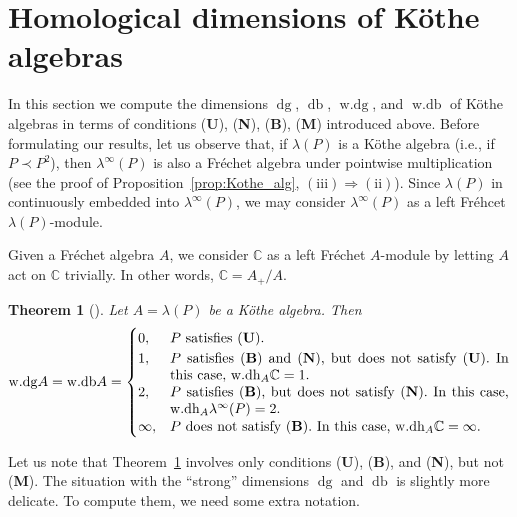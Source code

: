 \documentclass[12pt,reqno]{amsart}
\newtheorem{theorem}{Theorem}[section]
\theoremstyle{definition}
\begin{document}
\section{Homological dimensions of K\"othe algebras}
\label{sect:dims}
In this section we compute the dimensions ${\mathop{\mathrm{dg}}}$, ${\mathop{\mathrm{db}}}$, ${\mathop{\mathrm{w.dg}}}$, and ${\mathop{\mathrm{w.db}}}$ of K\"othe
algebras in terms of conditions ({\textbf{U}}), ({\textbf{N}}), ({\textbf{B}}), ({\textbf{M}}) introduced above.
Before formulating our results, let us observe that, if $\lambda(P)$ is a K\"othe algebra
(i.e., if $P\prec P^2$),
then $\lambda^\infty(P)$ is also a Fr\'echet algebra under
pointwise multiplication (see the proof of Proposition~\ref{prop:Kothe_alg},
$\mathrm{(iii)}\Longrightarrow\mathrm{(ii)}$).
Since $\lambda(P)$ in continuously embedded into $\lambda^\infty(P)$,
we may consider $\lambda^\infty(P)$ as a left Fr\'ehcet $\lambda(P)$-module.

Given a Fr\'echet algebra $A$, we consider ${\mathbb C}$ as a left Fr\'echet $A$-module by letting
$A$ act on ${\mathbb C}$ trivially. In other words, ${\mathbb C}=A_+/A$.

\begin{theorem}[{\cite[4.3]{Pir_QJM}}]
\label{thm:wdgwdb}
Let $A=\lambda(P)$ be a K\"othe algebra. Then
\begin{equation*}
{\mathop{\mathrm{w.dg}}} A={\mathop{\mathrm{w.db}}} A=
\begin{cases}
0, & \text{$P$ satisfies {\upshape ({\textbf{U}})}}.\\
1, & \parbox[t]{85mm}{$P$ satisfies {\upshape ({\textbf{B}})} and {\upshape ({\textbf{N}})},
but does not satisfy {\upshape ({\textbf{U}})}. In this case, ${\mathop{\mathrm{w.dh}}}_A{\mathbb C}=1.$}\\
2, & \parbox[t]{85mm}{$P$ satisfies {\upshape ({\textbf{B}})},
but does not satisfy {\upshape ({\textbf{N}})}. In this case, ${\mathop{\mathrm{w.dh}}}_A\lambda^\infty(P)=2$.}\\
\infty, & \parbox[t]{85mm}{$P$ does not satisfy {\upshape ({\textbf{B}})}. In this case,
${\mathop{\mathrm{w.dh}}}_A{\mathbb C}=\infty$.}
\end{cases}
\end{equation*}
\end{theorem}

Let us note that Theorem~\ref{thm:wdgwdb} involves only conditions
({\textbf{U}}), ({\textbf{B}}), and ({\textbf{N}}), but not ({\textbf{M}}).
The situation with the ``strong'' dimensions ${\mathop{\mathrm{dg}}}$ and ${\mathop{\mathrm{db}}}$ is slightly
more delicate. To compute them, we need some extra notation.
\end{document}
